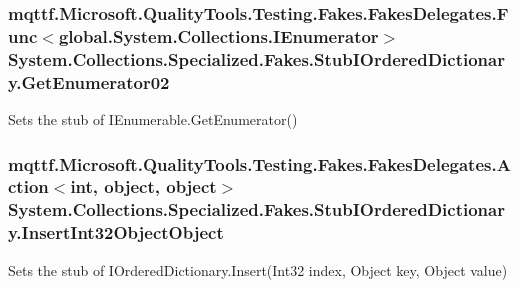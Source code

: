 \hypertarget{class_system_1_1_collections_1_1_specialized_1_1_fakes_1_1_stub_i_ordered_dictionary_a23983686818798e69058c063cc3c5a9e}{
\subsubsection[{Get\-Enumerator02}]{\setlength{\rightskip}{0pt plus 5cm}mqttf.\-Microsoft.\-Quality\-Tools.\-Testing.\-Fakes.\-Fakes\-Delegates.\-Func$<$global.\-System.\-Collections.\-I\-Enumerator$>$ System.\-Collections.\-Specialized.\-Fakes.\-Stub\-I\-Ordered\-Dictionary.\-Get\-Enumerator02}}\label{class_system_1_1_collections_1_1_specialized_1_1_fakes_1_1_stub_i_ordered_dictionary_a23983686818798e69058c063cc3c5a9e}


Sets the stub of I\-Enumerable.\-Get\-Enumerator()

\hypertarget{class_system_1_1_collections_1_1_specialized_1_1_fakes_1_1_stub_i_ordered_dictionary_ab147c12157a48c212eaccbfa8373a982}{
\subsubsection[{Insert\-Int32\-Object\-Object}]{\setlength{\rightskip}{0pt plus 5cm}mqttf.\-Microsoft.\-Quality\-Tools.\-Testing.\-Fakes.\-Fakes\-Delegates.\-Action$<$int, object, object$>$ System.\-Collections.\-Specialized.\-Fakes.\-Stub\-I\-Ordered\-Dictionary.\-Insert\-Int32\-Object\-Object}}\label{class_system_1_1_collections_1_1_specialized_1_1_fakes_1_1_stub_i_ordered_dictionary_ab147c12157a48c212eaccbfa8373a982}


Sets the stub of I\-Ordered\-Dictionary.\-Insert(\-Int32 index, Object key, Object value)

